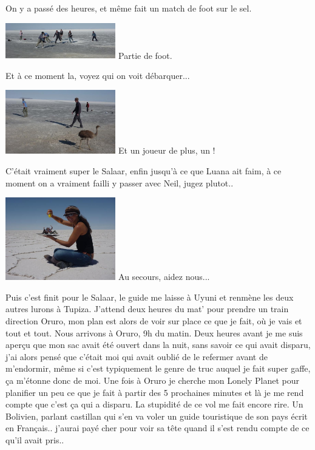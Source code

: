 \begin{multicols}{2}
On y a passé des heures, et même fait un match de foot sur le sel.

\hspace*{-0.65cm}
\includegraphics[width=4.8cm]{articles/La-paz-humahuaca-et-salaar/12573870691BvG.jpg}
Partie de foot.

Et à ce moment la, voyez qui on voit débarquer...

\hspace*{-0.65cm}
\includegraphics[width=4.8cm]{articles/La-paz-humahuaca-et-salaar/1257387056akBO.jpg}
Et un joueur de plus, un !

C'était vraiment super le Salaar, enfin jusqu'à ce que Luana ait faim, à ce moment on a vraiment failli y passer avec Neil, jugez plutot..

\hspace*{-0.65cm}
\includegraphics[width=4.8cm]{articles/La-paz-humahuaca-et-salaar/12572036252qaK.jpg}
Au secours, aidez nous...

Puis c'est finit pour le Salaar, le guide me laisse à Uyuni et renmène les deux autres lurons à Tupiza. J'attend deux heures du mat' pour prendre un train direction Oruro, mon plan est alors de voir sur place ce que je fait, où je vais et tout et tout. Nous arrivons à Oruro, 9h du matin. Deux heures avant je me suis aperçu que mon sac avait été ouvert dans la nuit, sans savoir ce qui avait disparu, j'ai alors pensé que c'était moi qui avait oublié de le refermer avant de m'endormir, même si c'est typiquement le genre de truc auquel je fait super gaffe, ça m'étonne donc de moi. Une fois à Oruro je cherche mon Lonely Planet pour planifier un peu ce que je fait à partir des 5 prochaines minutes et là je me rend compte que c'est ça qui a disparu. La stupidité de ce vol me fait encore rire. Un Bolivien, parlant castillan qui s'en va voler un guide touristique de son pays écrit en Français.. j'aurai payé cher pour voir sa tête quand il s'est rendu compte de ce qu'il avait pris..


\end{multicols}
